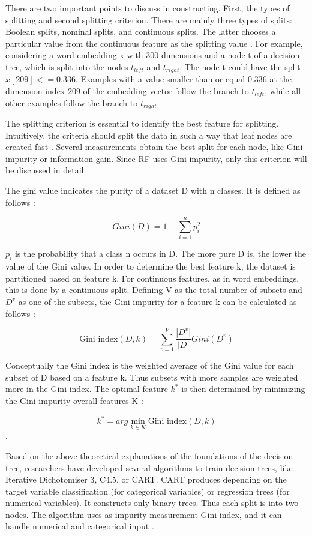\documentclass[12pt, a4paper, titlepage]{article}
\begin{document}
There are two important points to discuss in constructing. First, the types of splitting and second splitting criterion. There are mainly three types of splits: Boolean splits, nominal splits, and continuous splits. The latter chooses a particular value from the continuous feature as the splitting value \citep{cutler2012, Berthold2020}. For example, considering a word embedding x with 300 dimensions and a node t of a decision tree, which is split into the nodes $t_{left}$ and $t_{right}$. The node t could have the split $x[209] <= 0.336$. Examples with a value smaller than or equal $0.336$ at the dimension index $209$ of the embedding vector follow the branch to $t_{left}$, while all other examples follow the branch to $t_{right}$.

The splitting criterion is essential to identify the best feature for splitting. Intuitively, the criteria should split the data in such a way that leaf nodes are created fast \citep{Berthold2020}. Several measurements obtain the best split for each node, like Gini impurity or information gain. Since \ac{RF} uses Gini impurity, only this criterion will be discussed in detail. 

The gini value indicates the purity of a dataset D with n classes. It is defined as follows \citep[3156]{yuan2021}: 

\[Gini(D) = 1 - \sum_{i=1}^n p^2_i\]

$p_i$ is the probability that a class n occurs in D. The more pure D is, the lower the value of the Gini value. In order to determine the best feature k, the dataset is partitioned based on feature k. For continuous features, as in word embeddings, this is done by a continuous split. Defining V as the total number of subsets and $D^v$ as one of the subsets, the Gini impurity for a feature k can be calculated as follows \cite{yuan2021}: 

\[\text{Gini index}(D,k) = \sum_{v=1}^V \frac{|D^v|}{|D|} Gini(D^v) \]

Conceptually the Gini index is the weighted average of the Gini value for each subset of D based on a feature k. Thus subsets with more samples are weighted more in the Gini index. The optimal feature $k^*$ is then determined by minimizing the Gini impurity overall features K \citep[3156]{yuan2021}: 

\[ k^* = arg \min_{k \in K} \text{Gini index} (D,k) \]. 

Based on the above theoretical explanations of the foundations of the decision tree, researchers have developed several algorithms to train decision trees, like Iterative Dichotomiser 3, C4.5. or \ac{CART}. \ac{CART} produces depending on the target variable classification (for categorical variables) or regression trees (for numerical variables). It constructs only binary trees. Thus each split is into two nodes. The algorithm uses as impurity measurement Gini index, and it can handle numerical and categorical input \citep{brijain2014}.
\end{document}
